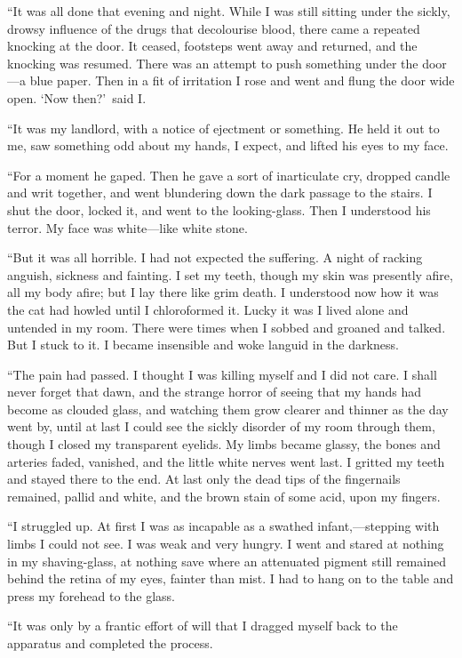 “It was all done that evening and night. While I was still sitting under the sickly, drowsy influence of the drugs that decolourise blood, there came a repeated knocking at the door. It ceased, footsteps went away and returned, and the knocking was resumed. There was an attempt to push something under the door—a blue paper. Then in a fit of irritation I rose and went and flung the door wide open. ‘Now then?’\ said I.

“It was my landlord, with a notice of ejectment or something. He held it out to me, saw something odd about my hands, I expect, and lifted his eyes to my face.

“For a moment he gaped. Then he gave a sort of inarticulate cry, dropped candle and writ together, and went blundering down the dark passage to the stairs. I shut the door, locked it, and went to the looking-glass. Then I understood his terror. My face was white—like white stone.

“But it was all horrible. I had not expected the suffering. A night of racking anguish, sickness and fainting. I set my teeth, though my skin was presently afire, all my body afire; but I lay there like grim death. I understood now how it was the cat had howled until I chloroformed it. Lucky it was I lived alone and untended in my room. There were times when I sobbed and groaned and talked. But I stuck to it. I became insensible and woke languid in the darkness.

“The pain had passed. I thought I was killing myself and I did not care. I shall never forget that dawn, and the strange horror of seeing that my hands had become as clouded glass, and watching them grow clearer and thinner as the day went by, until at last I could see the sickly disorder of my room through them, though I closed my transparent eyelids. My limbs became glassy, the bones and arteries faded, vanished, and the little white nerves went last. I gritted my teeth and stayed there to the end. At last only the dead tips of the fingernails remained, pallid and white, and the brown stain of some acid, upon my fingers.

“I struggled up. At first I was as incapable as a swathed infant,—stepping with limbs I could not see. I was weak and very hungry. I went and stared at nothing in my shaving-glass, at nothing save where an attenuated pigment still remained behind the retina of my eyes, fainter than mist. I had to hang on to the table and press my forehead to the glass.

“It was only by a frantic effort of will that I dragged myself back to the apparatus and completed the process.

